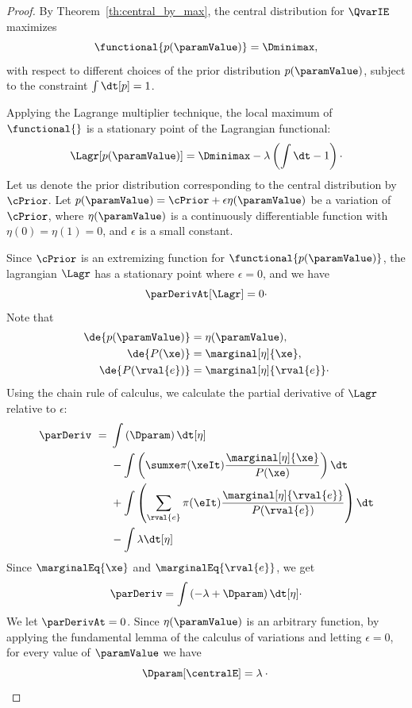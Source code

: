 \begin{proof}
    By Theorem~\ref{th:central_by_max}, the central distribution for $\QvarIE$ maximizes
    \[
        \functional{p(\paramValue)} = \Dminimax,
    \]
    with respect to different choices of the prior distribution $p(\paramValue)$, subject to the
    constraint $\int \dt[p] = 1$.

    Applying the Lagrange multiplier technique, the local maximum of $\functional{}$ is a stationary point of the
    Lagrangian functional:
    \[
        \Lagr[p(\paramValue)] = \Dminimax - \lambda \left( \int \dt - 1 \right)\cdot
    \]
    Let us denote the prior distribution corresponding to the central distribution \centralE by $\cPrior$.
    Let $p(\paramValue) = \cPrior + \epsilon \eta(\paramValue)$ be a variation of $\cPrior$, where $\eta(\paramValue)$ is
    a continuously differentiable function with $\eta(0) = \eta(1) = 0$, and $\epsilon$ is a small constant.

    Since $\cPrior$ is an extremizing function for $\functional{p(\paramValue)}$, the lagrangian
    $\Lagr$ has a stationary point where $\epsilon = 0$, and we have
    \[
        \parDerivAt[\Lagr] = 0\cdot
    \]
    Note that
    \begin{align*}
        \de{p(\paramValue)} &= \eta(\paramValue),\\
        \de{P(\xe)} &= \marginal[\eta]{\xe},\\
        \de{P(\rval{e})} &= \marginal[\eta]{\rval{e}}\cdot
    \end{align*}
    Using the chain rule of calculus, we calculate the partial derivative of $\Lagr$ relative to $\epsilon$:
    \begin{align*}
        \parDeriv\ =\ &\int \left( \Dparam  \right) \dt[\eta] \\
        &- \int \left( \sumxe \pi(\xeIt) \frac{\marginal[\eta]{\xe}}{P(\xe)} \right) \dt \\
        &+ \int \left( \sum_{\rval{e}} \pi(\eIt) \frac{\marginal[\eta]{\rval{e}}}{P(\rval{e})} \right) \dt \\
        &- \int \lambda \dt[\eta]
    \end{align*}
    Since $\marginalEq{\xe}$ and $\marginalEq{\rval{e}}$, we get
    \begin{equation*}
        \parDeriv = \int \left(-\lambda + \Dparam \right) \dt[\eta]\cdot
    \end{equation*}
    We let $ \parDerivAt = 0$.
    Since $\eta(\paramValue)$ is an arbitrary function, by applying the fundamental lemma of the calculus of
    variations and letting $\epsilon = 0$, for every value of $\paramValue$ we have
    \[
        \Dparam[\centralE] = \lambda\cdot \qedhere
    \]
\end{proof}

